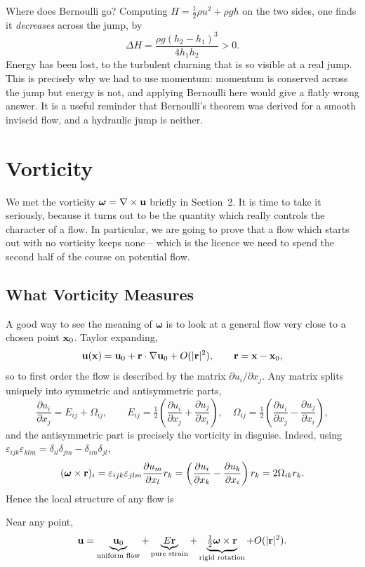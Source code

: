 \documentclass[a4paper]{scrartcl}
\newcommand{\pd}[2]{\frac{\partial #1}{\partial #2}}
\newcommand{\bom}{\boldsymbol{\omega}}
\begin{document}
\begin{example}
	Where does Bernoulli go? Computing $H = \tfrac{1}{2}\rho u^2 + \rho g h$ on the two sides, one finds it \emph{decreases} across the jump, by
	$$
	\Delta H = \frac{\rho g (h_2 - h_1)^3}{4h_1 h_2} > 0.
	$$
	Energy has been lost, to the turbulent churning that is so visible at a real jump. This is precisely why we had to use momentum: momentum is conserved across the jump but energy is not, and applying Bernoulli here would give a flatly wrong answer. It is a useful reminder that Bernoulli's theorem was derived for a smooth inviscid flow, and a hydraulic jump is neither.
\end{example}

\section{Vorticity} \label{sec:vorticity}

We met the vorticity $\bom = \nabla \times \vv u$ briefly in Section~2. It is time to take it seriously, because it turns out to be the quantity which really controls the character of a flow. In particular, we are going to prove that a flow which starts out with no vorticity keeps none -- which is the licence we need to spend the second half of the course on potential flow.

\subsection{What Vorticity Measures}

A good way to see the meaning of $\bom$ is to look at a general flow very close to a chosen point $\mathbf{x}_0$. Taylor expanding,
$$
\mathbf{u}(\mathbf{x}) = \mathbf{u}_0 + \mathbf{r} \cdot \nabla \mathbf{u}_0 + O(|\mathbf{r}|^2), \qquad \mathbf{r} = \mathbf{x} - \mathbf{x}_0,
$$
so to first order the flow is described by the matrix $\partial u_i / \partial x_j$. Any matrix splits uniquely into symmetric and antisymmetric parts,
$$
\pd{u_i}{x_j} = E_{ij} + \Omega_{ij}, \qquad E_{ij} = \tfrac{1}{2}\left(\pd{u_i}{x_j} + \pd{u_j}{x_i}\right), \quad \Omega_{ij} = \tfrac{1}{2}\left(\pd{u_i}{x_j} - \pd{u_j}{x_i}\right),
$$
and the antisymmetric part is precisely the vorticity in disguise. Indeed, using $\varepsilon_{ijk}\varepsilon_{klm} = \delta_{il}\delta_{jm} - \delta_{im}\delta_{jl}$,
$$
(\bom \times \vv r)_i = \varepsilon_{ijk}\varepsilon_{jlm}\pd{u_m}{x_l} r_k = \left(\pd{u_i}{x_k} - \pd{u_k}{x_i}\right)r_k = 2\Omega_{ik}r_k.
$$
Hence the local structure of any flow is

\begin{proposition}
	Near any point,
	$$
	\vv u = \underbrace{\vv u_0}_{\text{uniform flow}} + \underbrace{E\vv r}_{\text{pure strain}} + \underbrace{\tfrac{1}{2}\bom \times \vv r}_{\text{rigid rotation}} + O(|\vv r|^2).
	$$
\end{proposition}
\end{document}

